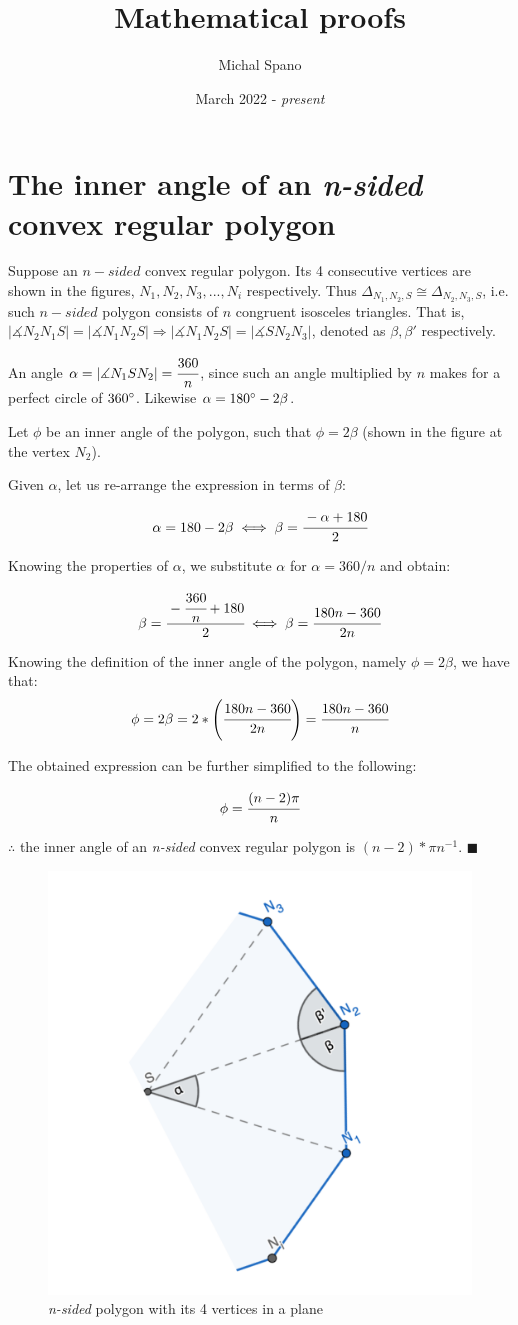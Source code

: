 \documentclass[10pt,a4paper]{article}
\title{\textbf{Mathematical proofs}}
\author{Michal Spano}
\date{March 2022 - \textit{present}}
\begin{document}
\maketitle

\section*{The inner angle of an \textit{n-sided} convex regular polygon}

Suppose an $n-sided$ convex regular polygon. Its 4 consecutive vertices are shown in the figures, $N_1, N_2, N_3, ..., N_i$ respectively.
Thus $\Delta_{N_1,N_2,S} \cong \Delta_{N_2,N_3,S}$, i.e. such $n-sided$ polygon consists of $n$ congruent isosceles triangles.
That is, $|\measuredangle N_2 N_1 S| = |\measuredangle N_1 N_2 S| \Rightarrow |\measuredangle N_1 N_2 S| = |\measuredangle S N_2 N_3|$,
denoted as $\beta, \beta'$ respectively.

An angle $\alpha = |\measuredangle N_1 S N_2| = \cfrac{360}{n}$, since such an angle multiplied by $n$ makes for a perfect circle of $360\degree$. 
Likewise $\alpha = 180\degree - 2 \beta$.

Let $\phi$ be an inner angle of the polygon, such that $\phi = 2 \beta$ (shown in the figure at the vertex $N_2$).

Given $\alpha$, let us re-arrange the expression in terms of $\beta$:

$$\alpha = 180 - 2 \beta \iff \beta = \cfrac{-\alpha + 180}{2}$$

Knowing the properties of $\alpha$, we substitute $\alpha$ for $\alpha = {360}/n$ and obtain:

$$\beta = \cfrac{-\cfrac{360}{n} + 180}{2} \iff \beta = \cfrac{180n - 360}{2n}$$

Knowing the definition of the inner angle of the polygon, namely $\phi = 2 \beta$, we have that:
$$\phi = 2 \beta = 2 \ast \Bigg( \cfrac{180n - 360}{2n} \Bigg) = \cfrac{180n - 360}{n}$$

The obtained expression can be further simplified to the following:

$$\phi = \cfrac{(n-2) \pi}{n}$$

$\therefore$ the inner angle of an \textit{n-sided} convex regular polygon is ${(n-2) \ast \pi}n^{-1}$. $\blacksquare$

\begin{figure}[htp]
    \centering
    \includegraphics[width=3.cm]{polygon_export.png}
    \caption{\textit{n-sided} polygon with its 4 vertices in a plane}
\end{figure}
\end{document}
